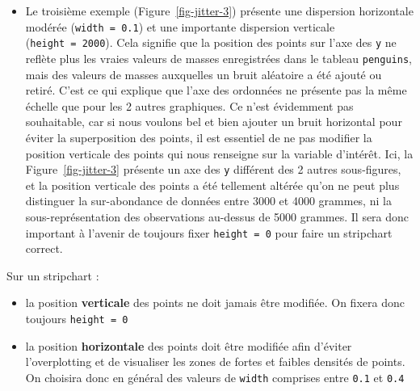 \documentclass[
  a4paper,
  DIV=11,
  numbers=noendperiod,
  oneside]{scrreprt}
\providecommand{\tightlist}{%
  \setlength{\itemsep}{0pt}\setlength{\parskip}{0pt}}\usepackage{longtable,booktabs,array}
\begin{document}
\begin{itemize}
\item
  Le troisième exemple (Figure~\ref{fig-jitter-3}) présente une
  dispersion horizontale modérée (\texttt{width\ =\ 0.1}) et une
  importante dispersion verticale (\texttt{height\ =\ 2000}). Cela
  signifie que la position des points sur l'axe des \texttt{y} ne
  reflète plus les vraies valeurs de masses enregistrées dans le tableau
  \texttt{penguins}, mais des valeurs de masses auxquelles un bruit
  aléatoire a été ajouté ou retiré. C'est ce qui explique que l'axe des
  ordonnées ne présente pas la même échelle que pour les 2 autres
  graphiques. Ce n'est évidemment pas souhaitable, car si nous voulons
  bel et bien ajouter un bruit horizontal pour éviter la superposition
  des points, il est essentiel de ne pas modifier la position verticale
  des points qui nous renseigne sur la variable d'intérêt. Ici, la
  Figure~\ref{fig-jitter-3} présente un axe des \texttt{y} différent des
  2 autres sous-figures, et la position verticale des points a été
  tellement altérée qu'on ne peut plus distinguer la sur-abondance de
  données entre 3000 et 4000 grammes, ni la sous-représentation des
  observations au-dessus de 5000 grammes. Il sera donc important à
  l'avenir de toujours fixer \texttt{height\ =\ 0} pour faire un
  stripchart correct.
\end{itemize}

\begin{tcolorbox}[enhanced jigsaw, coltitle=black, toprule=.15mm, opacityback=0, breakable, colback=white, opacitybacktitle=0.6, colframe=quarto-callout-important-color-frame, leftrule=.75mm, rightrule=.15mm, titlerule=0mm, bottomtitle=1mm, toptitle=1mm, arc=.35mm, title=\textcolor{quarto-callout-important-color}{\faExclamation}\hspace{0.5em}{Important}, colbacktitle=quarto-callout-important-color!10!white, bottomrule=.15mm, left=2mm]

Sur un stripchart :

\begin{itemize}
\tightlist
\item
  la position \textbf{verticale} des points ne doit jamais être
  modifiée. On fixera donc toujours \texttt{height\ =\ 0}
\item
  la position \textbf{horizontale} des points doit être modifiée afin
  d'éviter l'overplotting et de visualiser les zones de fortes et
  faibles densités de points. On choisira donc en général des valeurs de
  \texttt{width} comprises entre \texttt{0.1} et \texttt{0.4}
\end{itemize}

\end{tcolorbox}
\end{document}
